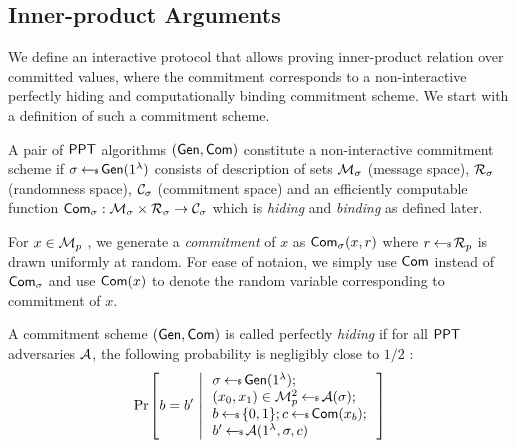 \subsection{Inner-product Arguments}
We define an interactive protocol that allows proving inner-product relation over committed values, where the commitment corresponds to a non-interactive perfectly hiding and computationally binding commitment scheme. We start with a definition of such a commitment scheme. 
\begin{definition}\label{defn:commscheme}
 A pair of $\mathsf{PPT}$ algorithms $(\mathsf{Gen},\mathsf{Com})$ constitute a non-interactive commitment scheme if $\sigma\hskip2.3pt{\gets\!\!\mbox{\tiny${\$}$\normalsize}}\, \mathsf{Gen}(1^{\lambda})$ consists of description of sets $\mathcal{M}_\sigma$ (message space), $\mathcal{R}_\sigma$ (randomness space), $\mathcal{C}_\sigma$ (commitment space) and an efficiently computable function $\mathsf{Com}_\sigma: \mathcal{M}_\sigma\times \mathcal{R}_\sigma\rightarrow \mathcal{C}_\sigma$ which is {\em hiding} and {\em binding} as defined later.
\end{definition}

For $x\in \mathcal{M}_p$ , we generate a {\em commitment} of $x$ as $\mathsf{Com}_\sigma(x,r)$ where $r\hskip2.3pt{\gets\!\!\mbox{\tiny${\$}$\normalsize}}\, \mathcal{R}_p$  is drawn uniformly at random. For ease of notaion, we simply use $\mathsf{Com}$ instead of $\mathsf{Com}_\sigma$ and use $\mathsf{Com}(x)$ to denote the random variable corresponding to commitment of $x$. 

\begin{definition}\label{defn:hidingcomm}
A commitment scheme $(\mathsf{Gen},\mathsf{Com})$ is called perfectly {\em hiding}  if for all $\mathsf{PPT}$  adversaries $\mathcal{A}$, the following probability is negligibly close to $1/2$ :
\begin{align*}
\condprob{b=b'}{
\begin{array}{l}
\sigma\sample \gen(\secparam); \\
(x_0,x_1)\in \calM^2_p\sample \adv(\sigma); \\
b\sample \bitset; c\sample \com(x_b);\\
b'\sample \adv(\secparam,\sigma,c)
\end{array}
}
\end{align*}
\end{definition}

